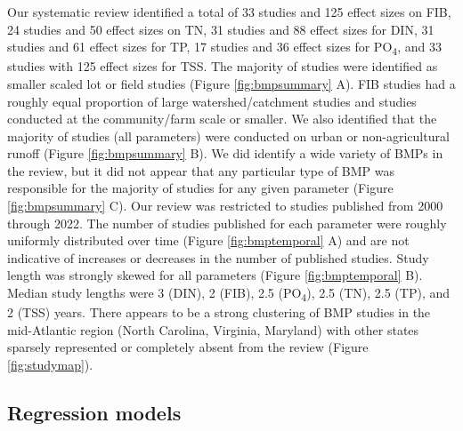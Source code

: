 \documentclass[utf8]{FrontiersinHarvard}
\begin{document}
Our systematic review identified a total of 33 studies and 125 effect sizes on FIB, 24 studies and 50 effect sizes on TN, 31 studies and 88 effect sizes for DIN, 31 studies and 61 effect sizes for TP, 17 studies and 36 effect sizes for PO\textsubscript{4}, and 33 studies with 125 effect sizes for TSS.
The majority of studies were identified as smaller scaled lot or field studies (Figure \ref{fig:bmpsummary} A).
FIB studies had a roughly equal proportion of large watershed/catchment studies and studies conducted at the community/farm scale or smaller.
We also identified that the majority of studies (all parameters) were conducted on urban or non-agricultural runoff (Figure \ref{fig:bmpsummary} B).
We did identify a wide variety of BMPs in the review, but it did not appear that any particular type of BMP was responsible for the majority of studies for any given parameter (Figure \ref{fig:bmpsummary} C).
Our review was restricted to studies published from 2000 through 2022.
The number of studies published for each parameter were roughly uniformly distributed over time (Figure \ref{fig:bmptemporal} A) and are not indicative of increases or decreases in the number of published studies.
Study length was strongly skewed for all parameters (Figure \ref{fig:bmptemporal} B). Median study lengths were 3 (DIN), 2 (FIB), 2.5 (PO\textsubscript{4}), 2.5 (TN), 2.5 (TP), and 2 (TSS) years.
There appears to be a strong clustering of BMP studies in the mid-Atlantic region (North Carolina, Virginia, Maryland) with other states sparsely represented or completely absent from the review (Figure \ref{fig:studymap}).

\hypertarget{regression-models}{%
\subsection{Regression models}\label{regression-models}}
\end{document}
